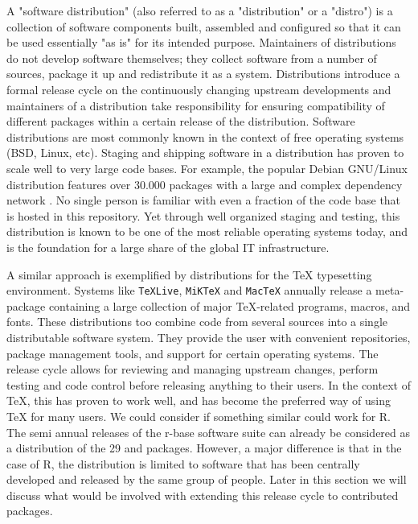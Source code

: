 A "software distribution" (also referred to as a "distribution" or a "distro") is a
collection of software components built, assembled and configured so that it
can be used essentially "as is" for its intended purpose. Maintainers of
distributions do not develop software themselves; they collect software from a
number of sources, package it up and redistribute it as a system. Distributions
introduce a formal release cycle on the continuously changing upstream developments and
maintainers of a distribution take responsibility for ensuring compatibility of 
different packages within a certain release of the distribution. Software
distributions are most commonly known in the context of free operating systems
(BSD, Linux, etc). Staging and shipping software in a distribution has proven
to scale well to very large code bases. For example, the popular Debian
GNU/Linux distribution features over 30.000 packages with a large and complex
dependency network \citep{garzarelli2003capability}. No
single person is familiar with even a fraction of the code base that is hosted
in this repository. Yet through well organized staging and testing, this
distribution is known to be one of the most reliable operating systems today,
and is the foundation for a large share of the global IT infrastructure.

A similar approach is exemplified by
distributions for the \TeX\xspace typesetting environment. Systems like \texttt{TeXLive},
\texttt{MiKTeX} and \texttt{MacTeX} annually release a meta-package containing a large
collection of major TeX-related programs, macros, and fonts. These distributions too
combine code from several sources into a single distributable software system. They
provide the user with convenient repositories, package management tools, and support
for certain operating systems. The release cycle allows for reviewing and managing
upstream changes, perform testing and code control before releasing anything to
their users. In the context of TeX, this has proven to work well, and has become the
preferred way of using TeX for many users. We could consider if something similar
could work for R. The semi annual releases of the r-base software suite can already
be considered as a distribution of the 29  and  packages.
However, a major difference is that in the case of R, the distribution is limited to
software that has been centrally developed and released by the same group of people. 
Later in this section we will discuss what would be involved with extending this
release cycle to contributed packages.

